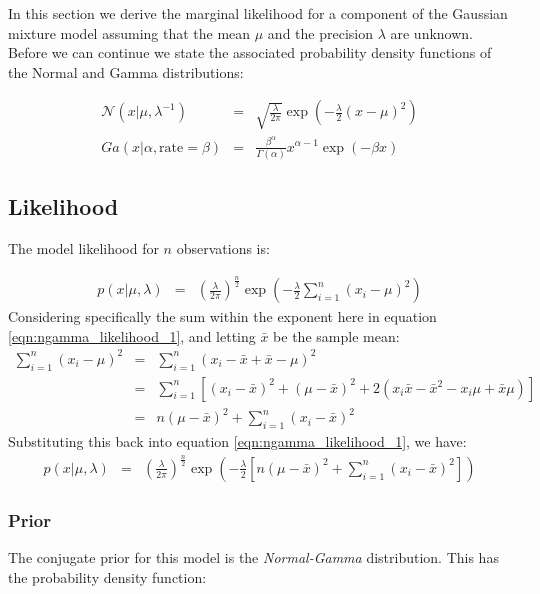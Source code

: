 \documentclass[12pt]{article} %
\begin{document}
	In this section we derive the marginal likelihood for a component of the Gaussian mixture model assuming that the mean $\mu$ and the precision $\lambda$ are unknown. Before we can continue we state the associated probability density functions of the Normal and Gamma distributions:
	
	\begin{eqnarray}
	\mathcal{N}(x | \mu, \lambda^{-1}) &=& \sqrt{\frac{\lambda}{2\pi}} \exp \left(- \frac{\lambda}{2}(x - \mu) ^ 2\right) \\
	Ga(x | \alpha, \mathrm{rate }= \beta) &=& \frac{\beta^\alpha}{\Gamma(\alpha)} x ^{\alpha - 1} \exp(-\beta x)
	\end{eqnarray}
	
	\subsection{Likelihood}
	The model likelihood for $n$ observations is:
	
	\begin{eqnarray}
	p(x | \mu, \lambda) &=& \left(\frac{\lambda}{2\pi}\right)^{\frac{n}{2}}\exp\left(-\frac{\lambda}{2} \sum_{i=1}^n(x_i - \mu)^2 \right) \label{eqn:ngamma_likelihood_1}
	\end{eqnarray}
	Considering specifically the sum within the exponent here in equation \ref{eqn:ngamma_likelihood_1}, and letting $\bar{x}$ be the sample mean:
	\begin{eqnarray}
	\sum_{i=1}^n(x_i - \mu)^2 &=& \sum_{i=1}^n(x_i - \bar{x} + \bar{x} - \mu)^2 \\
	&=& \sum_{i=1}^n\left[(x_i - \bar{x})^2 + (\mu - \bar{x})^2 + 2(x_i \bar{x} - \bar{x}^2 - x_i \mu + \bar{x} \mu)\right] \\
	&=& n(\mu - \bar{x})^2 + \sum_{i=1}^n (x_i - \bar{x})^2
	\end{eqnarray}
	Substituting this back into equation \ref{eqn:ngamma_likelihood_1}, we have:
	\begin{eqnarray}
	p(x | \mu, \lambda) &=& \left(\frac{\lambda}{2\pi}\right)^{\frac{n}{2}}\exp\left(-\frac{\lambda}{2} \left[n(\mu - \bar{x})^2 + \sum_{i=1}^n (x_i - \bar{x})^2\right] \right) \label{eqn:likelihood}
	\end{eqnarray}
		
	\subsubsection{Prior}
	The conjugate prior for this model is the \emph{Normal-Gamma} distribution. This has the probability density function:
	
\end{document}
